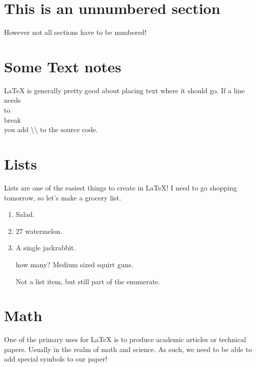 \documentclass[12pt]{article}
\begin{document}
\section*{This is an unnumbered section} 
However not all sections have to be numbered!

\section{Some Text notes}
\LaTeX \hspace{1pt} is generally pretty good about placing text where it should
go. If 
a line \\ needs \\ to \\ break \\ you add \textbackslash\textbackslash 
\hspace{1pt} to the source code. \\ 

\section{Lists}
Lists are one of the easiest things to create in \LaTeX! I need to go shopping
tomorrow, so let's make a grocery list.
\begin{enumerate} %
  \item Salad.
  \item 27 watermelon.
  \item A single jackrabbit.
  \item[how many?] Medium sized squirt guns.

  Not a list item, but still part of the enumerate.

\end{enumerate} %

\section{Math}

One of the primary uses for \LaTeX \hspace{1pt} is to produce academic articles
or technical papers. Usually in the realm of math and science. As such, 
we need to be able to add special symbols to our paper! \\
\end{document}
